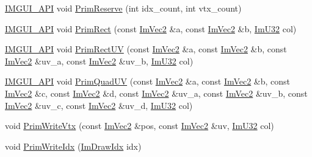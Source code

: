 \begin{DoxyCompactItemize}
\item 
\mbox{\hyperlink{imgui_8h_a43829975e84e45d1149597467a14bbf5}{I\+M\+G\+U\+I\+\_\+\+A\+PI}} void \mbox{\hyperlink{struct_im_draw_list_a879aa38dbfb0344e3e023d65c002c7d7}{Prim\+Reserve}} (int idx\+\_\+count, int vtx\+\_\+count)
\item 
\mbox{\hyperlink{imgui_8h_a43829975e84e45d1149597467a14bbf5}{I\+M\+G\+U\+I\+\_\+\+A\+PI}} void \mbox{\hyperlink{struct_im_draw_list_ae2be093563f1d20b8190b7c423113925}{Prim\+Rect}} (const \mbox{\hyperlink{struct_im_vec2}{Im\+Vec2}} \&a, const \mbox{\hyperlink{struct_im_vec2}{Im\+Vec2}} \&b, \mbox{\hyperlink{imgui_8h_a118cff4eeb8d00e7d07ce3d6460eed36}{Im\+U32}} col)
\item 
\mbox{\hyperlink{imgui_8h_a43829975e84e45d1149597467a14bbf5}{I\+M\+G\+U\+I\+\_\+\+A\+PI}} void \mbox{\hyperlink{struct_im_draw_list_a77d48ed5b33ccdd908824c0a3bebfff8}{Prim\+Rect\+UV}} (const \mbox{\hyperlink{struct_im_vec2}{Im\+Vec2}} \&a, const \mbox{\hyperlink{struct_im_vec2}{Im\+Vec2}} \&b, const \mbox{\hyperlink{struct_im_vec2}{Im\+Vec2}} \&uv\+\_\+a, const \mbox{\hyperlink{struct_im_vec2}{Im\+Vec2}} \&uv\+\_\+b, \mbox{\hyperlink{imgui_8h_a118cff4eeb8d00e7d07ce3d6460eed36}{Im\+U32}} col)
\item 
\mbox{\hyperlink{imgui_8h_a43829975e84e45d1149597467a14bbf5}{I\+M\+G\+U\+I\+\_\+\+A\+PI}} void \mbox{\hyperlink{struct_im_draw_list_a9df27414aaca5f34ac3664a8b82582b5}{Prim\+Quad\+UV}} (const \mbox{\hyperlink{struct_im_vec2}{Im\+Vec2}} \&a, const \mbox{\hyperlink{struct_im_vec2}{Im\+Vec2}} \&b, const \mbox{\hyperlink{struct_im_vec2}{Im\+Vec2}} \&c, const \mbox{\hyperlink{struct_im_vec2}{Im\+Vec2}} \&d, const \mbox{\hyperlink{struct_im_vec2}{Im\+Vec2}} \&uv\+\_\+a, const \mbox{\hyperlink{struct_im_vec2}{Im\+Vec2}} \&uv\+\_\+b, const \mbox{\hyperlink{struct_im_vec2}{Im\+Vec2}} \&uv\+\_\+c, const \mbox{\hyperlink{struct_im_vec2}{Im\+Vec2}} \&uv\+\_\+d, \mbox{\hyperlink{imgui_8h_a118cff4eeb8d00e7d07ce3d6460eed36}{Im\+U32}} col)
\item 
void \mbox{\hyperlink{struct_im_draw_list_af86de4faf6c8e978fb712ea14c5d0c5f}{Prim\+Write\+Vtx}} (const \mbox{\hyperlink{struct_im_vec2}{Im\+Vec2}} \&pos, const \mbox{\hyperlink{struct_im_vec2}{Im\+Vec2}} \&uv, \mbox{\hyperlink{imgui_8h_a118cff4eeb8d00e7d07ce3d6460eed36}{Im\+U32}} col)
\item 
void \mbox{\hyperlink{struct_im_draw_list_a42b72f87a0084c02f11dcd1560c8bbc7}{Prim\+Write\+Idx}} (\mbox{\hyperlink{imgui_8h_afdc8744a5ac1a968b1ddfa47e13b2fa1}{Im\+Draw\+Idx}} idx)
\item 

\end{DoxyCompactItemize}
